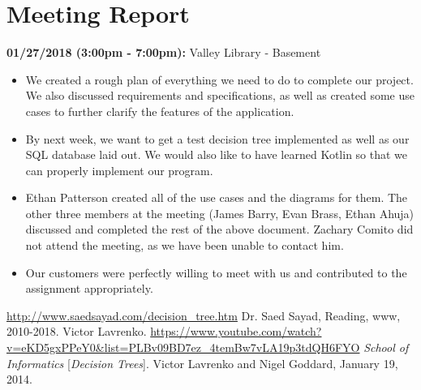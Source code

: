 \documentclass[a4paper]{article}
\begin{document}
\section{Meeting Report}
\textbf{01/27/2018 (3:00pm - 7:00pm):} Valley Library - Basement
\begin{itemize}
\item We created a rough plan of everything we need to do to complete our project. We also discussed requirements and specifications, as well as created some use cases to further clarify the features of the application. 
\item By next week, we want to get a test decision tree implemented as well as our SQL database laid out. We would also like to have learned Kotlin so that we can properly implement our program. 
\item Ethan Patterson created all of the use cases and the diagrams for them. The other three members at the meeting (James Barry, Evan Brass, Ethan Ahuja) discussed and completed the rest of the above document. Zachary Comito did not attend the meeting, as we have been unable to contact him.
\item Our customers were perfectly willing to meet with us and contributed to the assignment appropriately.
\end{itemize}

\newpage %
\begin{thebibliography}{9}
\url{http://www.saedsayad.com/decision_tree.htm}
Dr. Saed Sayad, Reading, www, 2010-2018.
Victor Lavrenko.
\url{https://www.youtube.com/watch?v=eKD5gxPPeY0&list=PLBv09BD7ez_4temBw7vLA19p3tdQH6FYO}
\textit{School of Informatics} 
[\textit{Decision Trees}]. 
Victor Lavrenko and Nigel Goddard, January 19, 2014.
\end{thebibliography}
\end{document}
